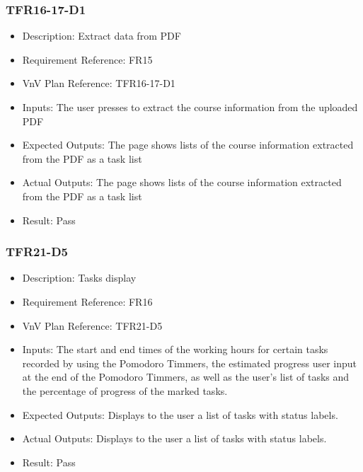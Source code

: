 \documentclass[12pt, titlepage]{article}
\begin{document}
\subsubsection{TFR16-17-D1}\label{3.2.14}
\begin{itemize}
    \item Description: Extract data from PDF
    \item Requirement Reference: FR15
    \item VnV Plan Reference: TFR16-17-D1
    \item Inputs: The user presses to extract the course information from the uploaded
PDF
    \item Expected Outputs: The page shows lists of the course information extracted from the PDF
as a task list
    \item Actual Outputs: The page shows lists of the course information extracted from the PDF
as a task list
    \item Result: Pass
\end{itemize}

\subsubsection{TFR21-D5}\label{3.2.15}
\begin{itemize}
    \item Description: Tasks display
    \item Requirement Reference: FR16
    \item VnV Plan Reference: TFR21-D5
    \item Inputs: The start and end times of the working hours for certain tasks recorded
by using the Pomodoro Timmers, the estimated progress user input at
the end of the Pomodoro Timmers, as well as the user’s list of tasks and the
percentage of progress of the marked tasks.
    \item Expected Outputs: Displays to the user a list of tasks with status labels.
    \item Actual Outputs: Displays to the user a list of tasks with status labels.
    \item Result: Pass
\end{itemize}
\end{document}
